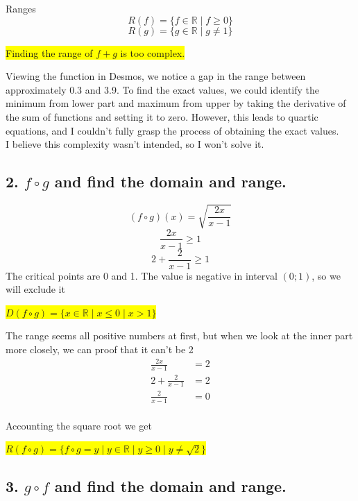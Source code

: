 \documentclass{article}
\begin{document}
Ranges
\[
R(f) = \{ f \in \mathbb{R} \mid f \geq 0 \}
\]
\[
R(g) = \{ g \in \mathbb{R} \mid g \neq 1 \}
\]

\begin{center}
\colorbox{yellow}{Finding the range of $f + g$ is too complex.}
\end{center}
Viewing the function in Desmos, we notice a gap in the range between approximately 0.3 and 3.9. To find the exact values, we could identify the minimum from lower part and maximum from upper by taking the derivative of the sum of functions and setting it to zero. However, this leads to quartic equations, and I couldn’t fully grasp the process of obtaining the exact values. \\
I believe this complexity wasn't intended, so I won't solve it.

\subsection*{2. $f \circ g$ and find the domain and range.}

\[
(f \circ g)(x) = \sqrt{\frac{2x}{x-1}}
\]
\[
\frac{2x}{x-1} \geq 1
\]
\[
2 + \frac{2}{x-1} \geq 1
\]
The critical points are 0 and 1. The value is negative in interval $(0; 1)$, so we will exclude it

\begin{center}
\colorbox{yellow}{$D(f \circ g) = \{ x \in \mathbb{R} \mid x \leq 0 \mid x > 1 \}$}
\end{center}

The range seems all positive numbers at first, but when we look at the inner part more closely, we can proof that it can't be 2
\[
\begin{aligned}
\frac{2x}{x-1} &= 2 \\
2 + \frac{2}{x-1} &= 2 \\ 
\frac{2}{x-1} &= 0 \\
\end{aligned}
\]

Accounting the square root we get

\begin{center}
\colorbox{yellow}{$R(f \circ g) = \{ f \circ g = y \mid y \in \mathbb{R} \mid y \geq 0 \mid y \neq \sqrt{2} \}$}
\end{center}


\subsection*{3. $g \circ f$ and find the domain and range.}
\end{document}
